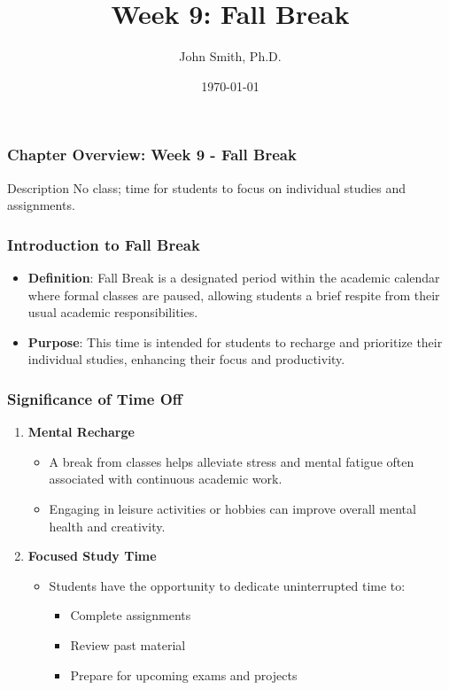 \documentclass[aspectratio=169]{beamer}
\title[Week 9: Fall Break]{Week 9: Fall Break}
\author[J. Smith]{John Smith, Ph.D.}
\institute[University Name]{Department of Computer Science\\University Name\\Email: email@university.edu\\Website: www.university.edu}
\date{\today}
\begin{document}
\frame{\titlepage}

\begin{frame}[fragile]
    \frametitle{Chapter Overview: Week 9 - Fall Break}
    \begin{block}{Description}
        No class; time for students to focus on individual studies and assignments.
    \end{block}
\end{frame}

\begin{frame}[fragile]
    \frametitle{Introduction to Fall Break}
    \begin{itemize}
        \item \textbf{Definition}: Fall Break is a designated period within the academic calendar where formal classes are paused, allowing students a brief respite from their usual academic responsibilities.
        \item \textbf{Purpose}: This time is intended for students to recharge and prioritize their individual studies, enhancing their focus and productivity.
    \end{itemize}
\end{frame}

\begin{frame}[fragile]
    \frametitle{Significance of Time Off}
    \begin{enumerate}
        \item \textbf{Mental Recharge}
            \begin{itemize}
                \item A break from classes helps alleviate stress and mental fatigue often associated with continuous academic work.
                \item Engaging in leisure activities or hobbies can improve overall mental health and creativity.
            \end{itemize}
        
        \item \textbf{Focused Study Time}
            \begin{itemize}
                \item Students have the opportunity to dedicate uninterrupted time to:
                    \begin{itemize}
                        \item Complete assignments
                        \item Review past material
                        \item Prepare for upcoming exams and projects
                    \end{itemize}
            \end{itemize}
    \end{enumerate}
\end{frame}
\end{document}
